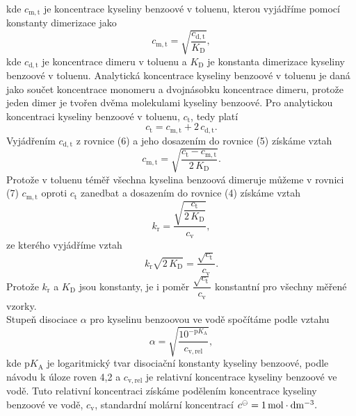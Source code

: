 \documentclass[12pt,a4paper]{article}
\def\ri#1{\mathrm{#1}}
\def\jd#1{\ifmmode\,\mathrm{#1}\else\,\textrm{#1}\fi}
\begin{document}
kde $c_\ri{m, t}$ je koncentrace kyseliny benzoové v toluenu, kterou vyjádříme pomocí konstanty dimerizace jako 
\begin{equation}
	c_\ri{m, t} = \sqrt{\dfrac{c_\ri{d, t}}{K_\ri{D}}},
\end{equation}
kde $c_\ri{d, t}$ je koncentrace dimeru v toluenu a $K_\ri{D}$ je konstanta dimerizace kyseliny benzoové v toluenu. Analytická koncentrace kyseliny benzoové v toluenu je daná jako součet koncentrace monomeru a dvojnásobku koncentrace dimeru, protože jeden dimer je tvořen dvěma molekulami kyseliny benzoové. Pro analytickou koncentraci kyseliny benzoové v toluenu, $c_\ri{t}$, tedy platí
\begin{equation}
	c_\ri{t} = c_\ri{m, t} + 2\,c_\ri{d, t}.
\end{equation}
Vyjádřením $c_\ri{d, t}$ z rovnice (6) a jeho dosazením do rovnice (5) získáme vztah
\begin{equation}
	c_\ri{m, t} = \sqrt{\dfrac{c_\ri{t}-c_\ri{m, t}}{2\,K_\ri{D}}}.
\end{equation}
Protože v toluenu téměř všechna kyselina benzoová dimeruje můžeme v rovnici (7) $c_\ri{m, t}$ oproti $c_\ri{t}$ zanedbat a dosazením do rovnice (4) získáme vztah
\begin{equation}
	k_\ri{r} = \dfrac{\sqrt{\dfrac{c_\ri{t}}{2\,K_\ri{D}}}}{c_\ri{v}},
\end{equation}
ze kterého vyjádříme vztah
\begin{equation}
	k_\ri{r}\sqrt{2\,K_\ri{D}} =  \dfrac{\sqrt{c_\ri{t}}}{c_\ri{v}}.
\end{equation}
Protože $k_\ri{r}$ a $K_\ri{D}$ jsou konstanty, je i poměr $\dfrac{\sqrt{c_\ri{t}}}{c_\ri{v}}$ konstantní pro všechny měřené vzorky.\\
Stupeň disociace $\alpha$ pro kyselinu benzoovou ve vodě spočítáme podle vztahu
\begin{equation}
	\alpha = \sqrt{\dfrac{10^{-\ri{p}K_\ri{A}}}{c_\ri{v, rel}}},
\end{equation}
kde p$K_\ri{A}$ je logaritmický tvar disociační konstanty kyseliny benzoové, podle návodu k úloze roven 4,2 a $c_\ri{v, rel}$ je relativní koncentrace kyseliny benzoové ve vodě. Tuto relativní koncentraci získáme podělením koncentrace kyseliny benzoové ve vodě, $c_\ri{v}$, standardní molární koncentrací $c^\ominus = 1\jd{mol\cdot dm^{-3}}.$
\end{document}
